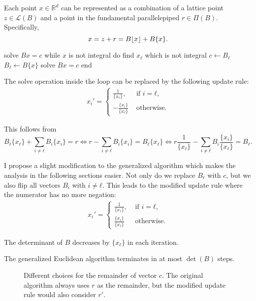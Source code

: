 Each point $x ∈ ℝ^d$ can be represented as a combination of a lattice point $z
∈ \mathcal{L}(B)$ and a point in the fundamental parallelepiped $r ∈ \Pi(B)$.
Specifically,
\[
  x = z + r = B\lfloor x\rfloor + B\{x\}.
\]

\begin{Pseudocode}[caption={The Generalized Euclidean Algorithm.}]
solve $Bx = c$
while $x$ is not integral do
  find $x_ℓ$ which is not integral
  $c ← B_ℓ$
  $B_ℓ ← B\{x\}$
  solve $Bx = c$
end
\end{Pseudocode}

The solve operation inside the loop can be replaced by the following update
rule:
\begin{align*}
  x_i' =
  \begin{cases}
    \frac{1}{\{x_ℓ\}},  & \text{ if } i = ℓ, \\
    -\frac{\{x_i\}}{\{x_ℓ\}} & \text{ otherwise.}
  \end{cases}
\end{align*}

This follows from
\[
  B_ℓ \{x_ℓ\} + \sum_{i ≠ ℓ} B_i \{x_i\} = r
  \iff
  r - \sum_{i ≠ ℓ} B_i \{x_i\} = B_ℓ \{x_ℓ\}
  \iff
  r \frac{1}{\{x_ℓ\}} - \sum_{i ≠ ℓ} B_i \frac{\{x_i\}}{\{x_ℓ\}} = B_ℓ.
\]

I propose a slight modification to the generalized algorithm
which makes the analysis in the following sections easier.
Not only do we replace $B_ℓ$ with $c$,
but we also flip all vectors $B_i$ with $i ≠ ℓ$.
This leads to the modified update rule
where the numerator has no more negation:
\begin{align*}
  x_i' =
  \begin{cases}
    \frac{1}{\{x_ℓ\}},  & \text{ if } i = ℓ, \\
    \frac{\{x_i\}}{\{x_ℓ\}} & \text{ otherwise.}
  \end{cases}
\end{align*}

\begin{lemma}
  The determinant of $B$ decreases by $\{x_ℓ\}$ in each iteration.
\end{lemma}

\begin{theorem}
  The generalized Euclidean algorithm terminates in at most $\det(B)$ steps.
\end{theorem}

\begin{figure}[t]
  \centering
  
  \caption{
    Different choices for the remainder of vector $c$. The original algorithm
    always uses $r$ as the remainder, but the modified update rule would also consider $r'$.}
\end{figure}

